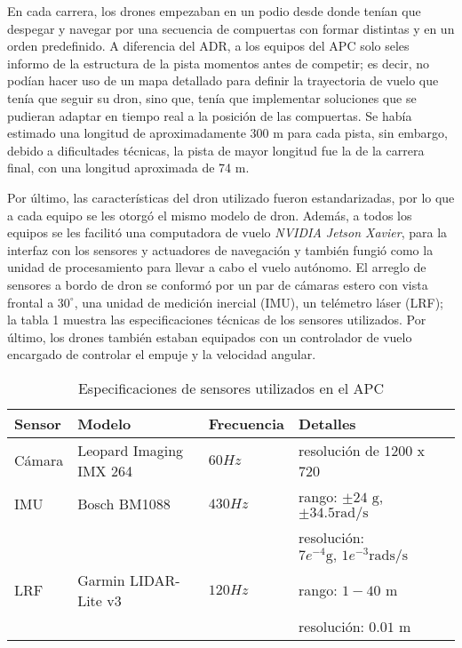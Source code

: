 En cada carrera, los drones empezaban en un podio desde donde tenían que despegar y navegar por una secuencia de compuertas con formar distintas y en un orden predefinido. A diferencia del ADR, a los equipos del APC solo seles informo de la estructura de la pista momentos antes de competir; es decir, no podían hacer uso de un mapa detallado para definir la trayectoria de vuelo que tenía que seguir su dron, sino que, tenía que implementar soluciones que se pudieran adaptar en tiempo real a la posición de las compuertas. Se había estimado una longitud de aproximadamente 300 m para cada pista, sin embargo, debido a dificultades técnicas, la pista de mayor longitud fue la de la carrera final, con una longitud aproximada de 74 m\cite{foehn2020alphapilot}.   

Por último, las características del dron utilizado fueron estandarizadas, por lo que a cada equipo se les otorgó el mismo modelo de dron. Además, a todos los equipos se les facilitó una computadora de vuelo \textit{NVIDIA Jetson Xavier}, para la interfaz con los sensores y actuadores de navegación y también fungió como la unidad de procesamiento para llevar a cabo el vuelo autónomo. El arreglo de sensores a bordo de dron se conformó por un par de cámaras estero con  vista frontal a $30^\circ$, una unidad de medición inercial (IMU), un telémetro láser (LRF); la tabla 1 muestra las especificaciones técnicas de los sensores utilizados. Por último, los drones también estaban equipados con un controlador de vuelo encargado de controlar el empuje y la velocidad angular.

\begin{table}
    \centering
    \begin{tabular}{llll}
        \hline
        Sensor & Modelo & Frecuencia & Detalles\\
        \hline
        Cámara & Leopard Imaging IMX 264 & $60 Hz$ & resolución de 1200 x 720\\
        IMU & Bosch BM1088 & $430 Hz$ & rango: $\pm 24 \text{ g}$, $\pm 34.5 \text{rad/s}$\\
         & & & resolución: $7e^{-4}\text{g, } 1e^{-3}\text{rads/s}$\\
        LRF & Garmin LIDAR-Lite v3 & $120 Hz$ & rango: $1-40$ m\\
        & & & resolución: $0.01 \text{ m}$\\
        \hline
    \end{tabular}
    \caption{Especificaciones de sensores utilizados en el APC \cite{foehn2020alphapilot}}
    \label{tab:sensors}
\end{table}

